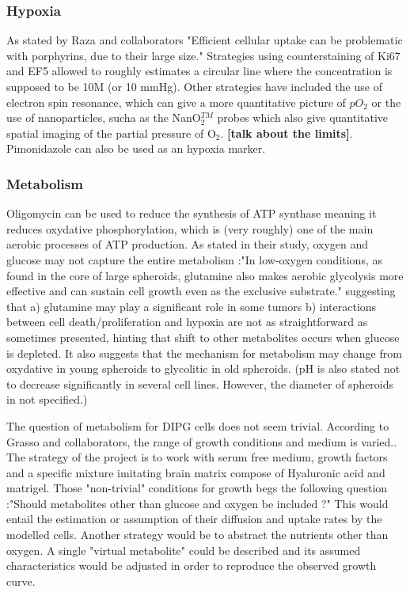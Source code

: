 \documentclass[11pt,a4paper]{article}
\begin{document}
\subsubsection{Hypoxia}
As stated by Raza and collaborators "Efficient cellular uptake can be problematic with porphyrins, due to their large size."\cite{Raza2017} Strategies using counterstaining of Ki67 and EF5 allowed to roughly estimates a circular line where the concentration is supposed to be 10\textmu M (or 10 mmHg)\cite{Grimes2014}\cite{Mao2018}. Other strategies have included the use of electron spin resonance\cite{Hashem2015}, which can give a more quantitative picture of $pO_2$ or the use of nanoparticles, sucha as the NanO$_2^{TM}$ probes which also give quantitative spatial imaging of the partial pressure of O$_2$.\cite{Dmitriev2014} \textbf{[talk about the limits]}. Pimonidazole can also be used  as an hypoxia marker. \cite{Onozato2017}

\subsubsection{Metabolism}
Oligomycin can be used to reduce the synthesis of ATP synthase meaning it reduces oxydative phosphorylation, which is (very roughly) one of the main aerobic processes of ATP production.\cite{Tidwell2022} As stated  in their study, oxygen and glucose may not capture the entire metabolism :"In low-oxygen conditions, as found in the core of large spheroids, glutamine also makes aerobic glycolysis more effective and can sustain cell growth even as the exclusive substrate." suggesting that a) glutamine may play a significant role in some tumors b) interactions between cell death/proliferation and hypoxia are not as straightforward as sometimes presented, hinting that shift to other metabolites occurs when glucose is depleted.\cite{Damiani2017}\cite{Rodriguez2008} It also suggests that the mechanism for metabolism may change from oxydative in young spheroids to glycolitic in old spheroids. \cite{Rodriguez2008} (pH is also stated not to decrease significantly in several cell lines. However, the diameter of spheroids in not specified.)

The question of metabolism for DIPG cells does not seem trivial. According to Grasso and collaborators, the range of growth conditions and medium is varied.\cite{Grasso2015}. The strategy of the project is to work with serum free medium, growth factors and a specific mixture imitating brain matrix compose of Hyaluronic acid and matrigel. Those "non-trivial" conditions for growth begs the following question :"Should metabolites other than glucose and oxygen be included ?" This would entail the estimation or assumption of their diffusion and uptake rates by the modelled cells. Another strategy would be to abstract the nutrients other than oxygen. A single "virtual metabolite" could be described and its assumed characteristics would be adjusted in order to reproduce the observed growth curve. 
\end{document}

